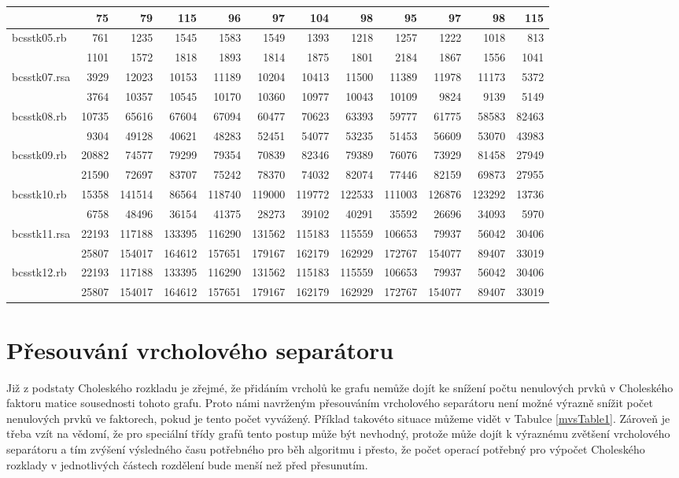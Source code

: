 \documentclass{ctuthesis}
\theoremstyle{plain}
\theoremstyle{definition}
\begin{document}
{\begin{tabular}{|l|rrrrrrrrrrr|}
  &75&79&115&96&97&104&98&95&97&98&115	\\
  \hline
  \multirow{2}{*}{bcsstk05.rb}&761&1235&1545&1583&1549&1393&1218&1257&1222&1018&813	\\
  &1101&1572&1818&1893&1814&1875&1801&2184&1867&1556&1041	\\
  \hline
  \multirow{2}{*}{bcsstk07.rsa}&3929&12023&10153&11189&10204&10413&11500&11389&11978&11173&5372	\\
  &3764&10357&10545&10170&10360&10977&10043&10109&9824&9139&5149	\\
  \hline
  \multirow{2}{*}{bcsstk08.rb}&10735&65616&67604&67094&60477&70623&63393&59777&61775&58583&82463	\\
  &9304&49128&40621&48283&52451&54077&53235&51453&56609&53070&43983	\\
  \hline
  \multirow{2}{*}{bcsstk09.rb}&20882&74577&79299&79354&70839&82346&79389&76076&73929&81458&27949	\\
  &21590&72697&83707&75242&78370&74032&82074&77446&82159&69873&27955	\\
  \hline
  \multirow{2}{*}{bcsstk10.rb}&15358&141514&86564&118740&119000&119772&122533&111003&126876&123292&13736	\\
  &6758&48496&36154&41375&28273&39102&40291&35592&26696&34093&5970	\\
  \hline
  \multirow{2}{*}{bcsstk11.rsa}&22193&117188&133395&116290&131562&115183&115559&106653&79937&56042&30406	\\
  &25807&154017&164612&157651&179167&162179&162929&172767&154077&89407&33019	\\
  \hline
  \multirow{2}{*}{bcsstk12.rb}&22193&117188&133395&116290&131562&115183&115559&106653&79937&56042&30406	\\
  &25807&154017&164612&157651&179167&162179&162929&172767&154077&89407&33019	\\
  \hline
\end{tabular}
}

\section{Přesouvání vrcholového separátoru}

Již z podstaty Choleského rozkladu je zřejmé, že přidáním vrcholů ke grafu nemůže dojít ke snížení počtu nenulových prvků v Choleského faktoru matice sousednosti tohoto grafu. Proto námi navrženým přesouváním vrcholového separátoru není možné výrazně snížit počet nenulových prvků ve faktorech, pokud je tento počet vyvážený. Příklad takovéto situace můžeme vidět v Tabulce \ref{mvsTable1}. Zároveň je třeba vzít na vědomí, že pro speciální třídy grafů tento postup může být nevhodný, protože může dojít k výraznému zvětšení vrcholového separátoru a tím zvýšení výsledného času potřebného pro běh algoritmu i přesto, že počet operací potřebný pro výpočet Choleského rozklady v jednotlivých částech rozdělení bude menší než před přesunutím.
\end{document}
